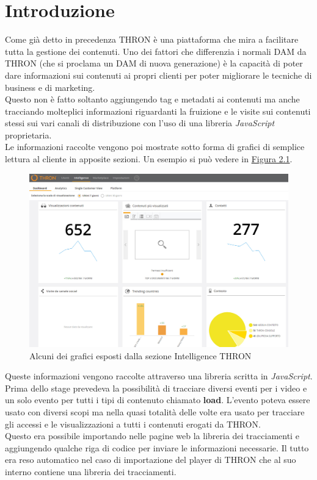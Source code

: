 \documentclass[a4paper, 12pt, twoside, openright]{book}
\begin{document}
\section{Introduzione}
Come già detto in precedenza THRON è una piattaforma che mira a facilitare tutta la gestione dei contenuti. Uno dei fattori che differenzia i normali DAM da THRON (che si proclama un DAM di nuova generazione) è la capacità di poter dare informazioni sui contenuti ai propri clienti per poter migliorare le tecniche di business e di marketing.\\
Questo non è fatto soltanto aggiungendo tag e metadati ai contenuti ma anche tracciando molteplici informazioni riguardanti la fruizione e le visite sui contenuti stessi sui vari canali di distribuzione con l'uso di una libreria \textit{JavaScript} proprietaria.\\
Le informazioni raccolte vengono poi mostrate sotto forma di grafici di semplice lettura al cliente in apposite sezioni. Un esempio si può vedere in \hyperref[reports-example]{Figura 2.1}.\\
\begin{figure}[h]
	\centering
	\label{reports-example}
	\includegraphics[width=1.0\textwidth]{images/reports-example.jpg}
	\caption{Alcuni dei grafici esposti dalla sezione Intelligence THRON}
\end{figure} 

Queste informazioni vengono raccolte attraverso una libreria scritta in \textit{JavaScript}. Prima dello stage prevedeva la possibilità di tracciare diversi eventi per i video e un solo evento per tutti i tipi di contenuto chiamato \textbf{load}. L'evento poteva essere usato con diversi scopi ma nella quasi totalità delle volte era usato per tracciare gli accessi e le visualizzazioni a tutti i contenuti erogati da THRON.\\
Questo era possibile importando nelle pagine web la libreria dei tracciamenti e aggiungendo qualche riga di codice per inviare le informazioni necessarie. Il tutto era reso automatico nel caso di importazione del player di THRON che al suo interno contiene una libreria dei tracciamenti.\\
\end{document}
